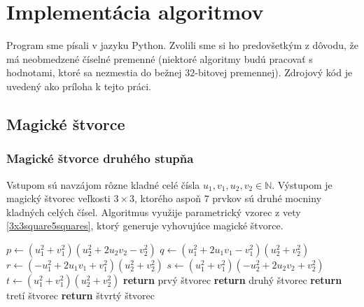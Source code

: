 \chapter{Implementácia algoritmov}

\label{kap:implementation} %

Program sme písali v jazyku Python. Zvolili sme si ho predovšetkým z dôvodu, že má neobmedzené číselné premenné (niektoré algoritmy budú pracovať s hodnotami, ktoré sa nezmestia do bežnej $32$-bitovej premennej). Zdrojový kód je uvedený ako príloha k tejto práci.

\section{Magické štvorce}

\subsection{Magické štvorce druhého stupňa}

\begin{alg} 
\label{algsquare3x3uvw}
Vstupom sú navzájom rôzne kladné celé čísla $u_1, v_1, u_2, v_2 \in \mathbb{N}$. Výstupom je magický štvorec veľkosti $3 \times 3$, ktorého aspoň $7$ prvkov sú druhé mocniny kladných celých čísel. Algoritmus využije parametrický vzorec z vety \ref{3x3square5squares}, ktorý generuje vyhovujúce magické štvorce.
\end{alg}

\begin{algorithmic}
\State $p \gets (u_1^2 + v_1^2)(u_2^2 + 2u_2 v_2 - v_2^2)$
\State $q \gets (u_1^2 + 2u_1 v_1 - v_1^2)(u_2^2 + v_2^2)$
\State $r \gets (- u_1^2 + 2u_1 v_1 + v_1^2)(u_2^2 + v_2^2)$
\State $s \gets (u_1^2 + v_1^2)(-u_2^2 + 2u_2 v_2 + v_2^2)$
\State $t \gets (u_1^2 + v_1^2)(u_2^2 + v_2^2)$
    \STATE \textbf{return} prvý štvorec
\ENDIF
{}
    \STATE \textbf{return} druhý štvorec
\ENDIF
{}
    \STATE \textbf{return} tretí štvorec
\ENDIF
{}
    \STATE \textbf{return} štvrtý štvorec
\ENDIF
\end{algorithmic}


